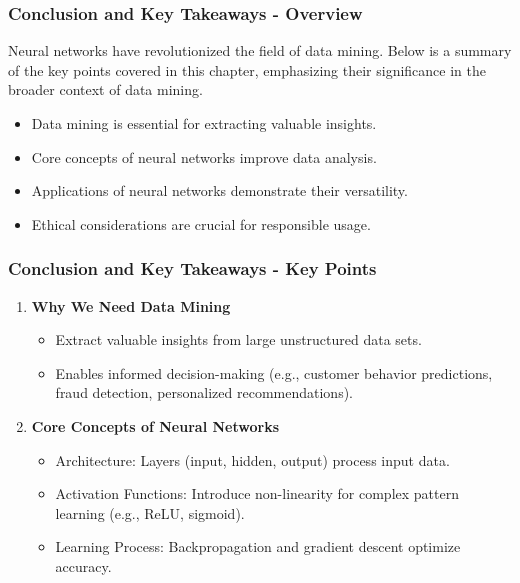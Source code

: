 \documentclass[aspectratio=169]{beamer}
\begin{document}
\begin{frame}[fragile]
    \frametitle{Conclusion and Key Takeaways - Overview}
    Neural networks have revolutionized the field of data mining. Below is a summary of the key points covered in this chapter, emphasizing their significance in the broader context of data mining.
    
    \begin{itemize}
        \item Data mining is essential for extracting valuable insights.
        \item Core concepts of neural networks improve data analysis.
        \item Applications of neural networks demonstrate their versatility.
        \item Ethical considerations are crucial for responsible usage.
    \end{itemize}

\end{frame}

\begin{frame}[fragile]
    \frametitle{Conclusion and Key Takeaways - Key Points}
    
    \begin{enumerate}
        \item \textbf{Why We Need Data Mining}
            \begin{itemize}
                \item Extract valuable insights from large unstructured data sets.
                \item Enables informed decision-making (e.g., customer behavior predictions, fraud detection, personalized recommendations).
            \end{itemize}
        
        \item \textbf{Core Concepts of Neural Networks}
            \begin{itemize}
                \item Architecture: Layers (input, hidden, output) process input data.
                \item Activation Functions: Introduce non-linearity for complex pattern learning (e.g., ReLU, sigmoid).
                \item Learning Process: Backpropagation and gradient descent optimize accuracy.
            \end{itemize}
    \end{enumerate}

\end{frame}
\end{document}
